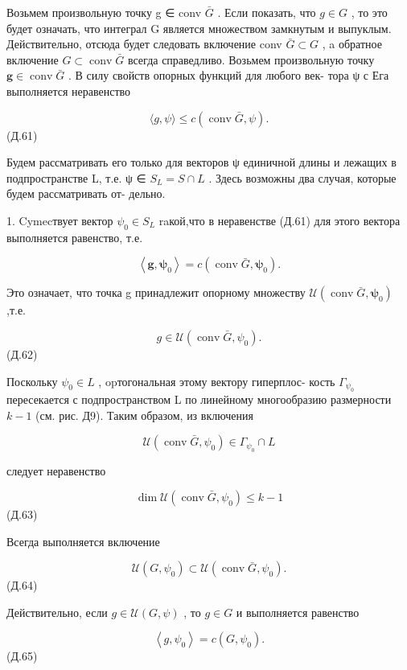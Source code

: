 \documentclass[8pt]{extarticle}
\begin{document}
Возьмем произвольную точку g ∈ conv \(\bar{G}\) . Если показать, что \(g \in  G\) , то это будет означать, что интеграл G является множеством замкнутым и выпуклым. Действительно, отсюда будет следовать включение conv \(\bar{G} \subset  G\) , a обратное включение \(G \subset  \operatorname{conv}\bar{G}\) всегда справедливо. Возьмем произвольную точку \(\mathbf{g} \in  \operatorname{conv}\bar{G}\) . В силу свойств опорных функций для любого век- тора ψ с Ега выполняется неравенство

\[
\langle g,\psi \rangle  \leq  c\left( {\operatorname{conv}\bar{G},\psi }\right) .
\]
 (Д.61)

Будем рассматривать его только для векторов ψ единичной длины и лежащих в подпространстве L, т.е. ψ ∈ \({S}_{L} = S \cap  L\) . Здесь возможны два случая, которые будем рассматривать от- дельно.

1. Cymecтвует вектор \({\psi }_{0} \in  {S}_{L}\) raкой,что в неравенстве (Д.61) для этого вектора выполняется равенство, т.е.

\[
\left\langle  {\mathbf{g},{\mathbf{\psi }}_{0}}\right\rangle   = c\left( {\operatorname{conv}\bar{G},{\mathbf{\psi }}_{0}}\right) .
\]

Это означает, что точка g принадлежит опорному множеству \(\mathcal{U}\left( {\operatorname{conv}\bar{G},{\mathbf{\psi }}_{0}}\right)\) ,т.е.

\[
g \in  \mathcal{U}\left( {\operatorname{conv}\bar{G},{\psi }_{0}}\right) .
\]
 (Д.62)

Поскольку \({\psi }_{0} \in  L\) , opтогональная этому вектору гиперплос- кость \({\Gamma }_{{\psi }_{0}}\) пересекается с подпространством L по линейному многообразию размерности \(k - 1\) (см. рис. Д9). Таким образом, из включения

\[
\mathcal{U}\left( {\operatorname{conv}\bar{G},{\psi }_{0}}\right)  \in  {\Gamma }_{{\psi }_{0}} \cap  L
\]

следует неравенство

\[
\dim \mathcal{U}\left( {\operatorname{conv}\bar{G},{\psi }_{0}}\right)  \leq  k - 1
\]
 (Д.63)

Всегда выполняется включение

\[
\mathcal{U}\left( {G,{\psi }_{0}}\right)  \subset  \mathcal{U}\left( {\operatorname{conv}\bar{G},{\psi }_{0}}\right) .
\]
 (Д.64)

Действительно, если \(g \in  \mathcal{U}\left( {G,\psi }\right)\) , то \(g \in  G\) и выполняется равенство

\[
\left\langle  {g,{\psi }_{0}}\right\rangle   = c\left( {G,{\psi }_{0}}\right) .
\]
 (Д.65)
\end{document}
